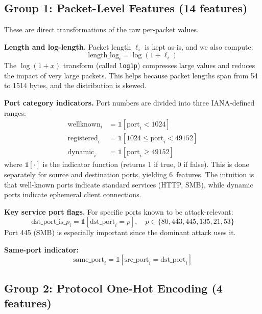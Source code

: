 \documentclass[conference]{IEEEtran}
\begin{document}
\subsection{Group 1: Packet-Level Features (14 features)}

These are direct transformations of the raw per-packet values.

\textbf{Length and log-length.} Packet length $\ell_i$ is kept as-is, and we also compute:
\begin{equation}
    \text{length\_log}_i = \log(1 + \ell_i)
\end{equation}
The $\log(1 + x)$ transform (called \texttt{log1p}) compresses large values and reduces the impact of very large packets. This helps because packet lengths span from 54 to 1514 bytes, and the distribution is skewed.

\textbf{Port category indicators.} Port numbers are divided into three IANA-defined ranges:
\begin{align}
    \text{wellknown}_i &= \mathbb{1}[\text{port}_i < 1024] \\
    \text{registered}_i &= \mathbb{1}[1024 \leq \text{port}_i < 49152] \\
    \text{dynamic}_i &= \mathbb{1}[\text{port}_i \geq 49152]
\end{align}
where $\mathbb{1}[\cdot]$ is the indicator function (returns 1 if true, 0 if false). This is done separately for source and destination ports, yielding 6~features. The intuition is that well-known ports indicate standard services (HTTP, SMB), while dynamic ports indicate ephemeral client connections.

\textbf{Key service port flags.} For specific ports known to be attack-relevant:
\begin{equation}
    \text{dst\_port\_is\_}p_i = \mathbb{1}[\text{dst\_port}_i = p], \quad p \in \{80, 443, 445, 135, 21, 53\}
\end{equation}
Port 445 (SMB) is especially important since the dominant attack uses it.

\textbf{Same-port indicator:}
\begin{equation}
    \text{same\_port}_i = \mathbb{1}[\text{src\_port}_i = \text{dst\_port}_i]
\end{equation}

\subsection{Group 2: Protocol One-Hot Encoding (4 features)}
\end{document}
